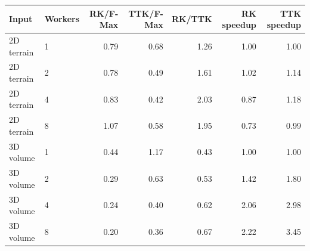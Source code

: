 \begin{tabular}{llrrrrr}
\toprule
Input & Workers & RK/F-Max & TTK/F-Max & RK/TTK & RK speedup & TTK speedup \\
\midrule
2D terrain & 1 & 0.79 & 0.68 & 1.26 & 1.00 & 1.00 \\
2D terrain & 2 & 0.78 & 0.49 & 1.61 & 1.02 & 1.14 \\
2D terrain & 4 & 0.83 & 0.42 & 2.03 & 0.87 & 1.18 \\
2D terrain & 8 & 1.07 & 0.58 & 1.95 & 0.73 & 0.99 \\
\midrule
3D volume & 1 & 0.44 & 1.17 & 0.43 & 1.00 & 1.00 \\
3D volume & 2 & 0.29 & 0.63 & 0.53 & 1.42 & 1.80 \\
3D volume & 4 & 0.24 & 0.40 & 0.62 & 2.06 & 2.98 \\
3D volume & 8 & 0.20 & 0.36 & 0.67 & 2.22 & 3.45 \\
\bottomrule
\end{tabular}
